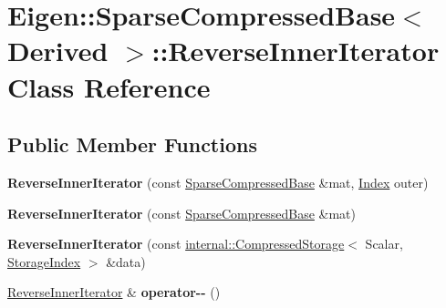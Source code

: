 \hypertarget{class_eigen_1_1_sparse_compressed_base_1_1_reverse_inner_iterator}{}\section{Eigen\+::Sparse\+Compressed\+Base$<$ Derived $>$\+::Reverse\+Inner\+Iterator Class Reference}
\label{class_eigen_1_1_sparse_compressed_base_1_1_reverse_inner_iterator}
\subsection*{Public Member Functions}
\begin{DoxyCompactItemize}
\item 
\mbox{\label{class_eigen_1_1_sparse_compressed_base_1_1_reverse_inner_iterator_afc971eba8c166a01022aaa19287b928f}} 
{\bfseries Reverse\+Inner\+Iterator} (const \mbox{\hyperlink{class_eigen_1_1_sparse_compressed_base}{Sparse\+Compressed\+Base}} \&mat, \mbox{\hyperlink{struct_eigen_1_1_eigen_base_a554f30542cc2316add4b1ea0a492ff02}{Index}} outer)
\item 
\mbox{\label{class_eigen_1_1_sparse_compressed_base_1_1_reverse_inner_iterator_aee0170e7880e650c5b57913c9aee5614}} 
{\bfseries Reverse\+Inner\+Iterator} (const \mbox{\hyperlink{class_eigen_1_1_sparse_compressed_base}{Sparse\+Compressed\+Base}} \&mat)
\item 
\mbox{\label{class_eigen_1_1_sparse_compressed_base_1_1_reverse_inner_iterator_ae51ccd7f9f11df3fc6d2e1a92200b66d}} 
{\bfseries Reverse\+Inner\+Iterator} (const \mbox{\hyperlink{class_eigen_1_1internal_1_1_compressed_storage}{internal\+::\+Compressed\+Storage}}$<$ Scalar, \mbox{\hyperlink{class_eigen_1_1_sparse_matrix_base_a0b540ba724726ebe953f8c0df06081ed}{Storage\+Index}} $>$ \&data)
\item 
\mbox{\label{class_eigen_1_1_sparse_compressed_base_1_1_reverse_inner_iterator_a66e4aa4f9c7387dc90026d68dfff562a}} 
\mbox{\hyperlink{class_eigen_1_1_sparse_compressed_base_1_1_reverse_inner_iterator}{Reverse\+Inner\+Iterator}} \& {\bfseries operator-\/-\/} ()

\end{DoxyCompactItemize}

